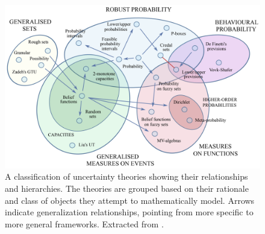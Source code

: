 \begin{figure}[!ht]
    \includegraphics[width=\textwidth]{ch0/figures/Uncertainties Diagram.png}
    \caption{A classification of uncertainty theories showing their relationships and hierarchies. The theories are grouped based on their rationale and class of objects they attempt to mathematically model. Arrows indicate generalization relationships, pointing from more specific to more general frameworks. Extracted from \cite{uncertaintymeasuresbigpicture}.}
    \label{fig:uncertainty_taxonomy}
\end{figure}











































